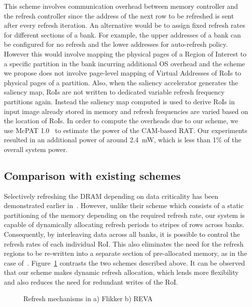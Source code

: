 This scheme involves communication overhead between memory controller and the refresh controller since the address of the next row to be refreshed is sent after every refresh iteration. An alternative would be to assign fixed refresh rates for different sections of a bank. For example, the upper addresses of a bank can be configured for no refresh and the lower addresses for auto-refresh policy. However this would involve mapping the physical pages of a Region of Interest to a specific partition in the bank incurring additional OS overhead and the scheme we propose does not involve page-level mapping of Virtual Addresses of RoIs to physical pages of a partition. Also, when the saliency accelerator generates the saliency map, RoIs are not written to dedicated variable refresh frequency partitions again. Instead the saliency map computed is used to derive RoIs in input image already stored in memory and refresh frequencies are varied based on the location of RoIs. In order to compute the overheads due to our scheme, we use McPAT 1.0~\cite{mcpat} to estimate the power of the CAM-based RAT. Our experiments resulted in an additional power of around 2.4~mW, which is less than 1\% of the overall system power.

\subsection{Comparison with existing schemes}
Selectively refreshing the DRAM depending on data criticality has been demonstrated earlier in~\cite{Liu2011}. However, unlike their scheme which consists of a static partitioning of the memory depending on the required refresh rate, our system is capable of dynamically allocating refresh periods to stripes of rows across banks. Consequently, by interleaving data across all banks, it is possible to control the refresh rates of each individual RoI. 
This also eliminates the need for the refresh regions to be re-written into a separate section of pre-allocated memory, as in the case of~\cite{Liu2011}. Figure~\ref{fig:reva-refresh} contrasts the two schemes described above. It can be observed that our scheme makes dynamic refresh allocation, which lends more flexibility and also reduces the need for redundant writes of the RoI.

\begin{figure}[ht!]
\centering
{}
\caption{\label{fig:reva-refresh} Refresh mechanisms in a) Flikker  b) REVA}
\vspace{-0.2in}
\end{figure}
